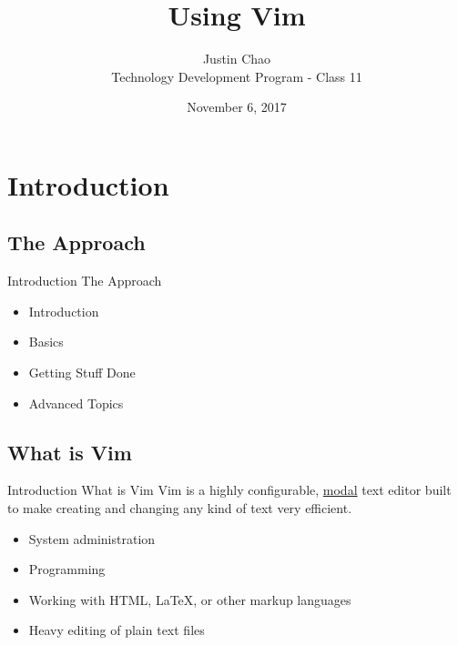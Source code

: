 \documentclass{beamer}
\title{Using Vim}
\author{Justin Chao \\ Technology Development Program - Class 11 \\}
\date{November 6, 2017}
\begin{document}
\frame{\titlepage}

\section{Introduction}

\subsection{The Approach}
\begin{frame} {Introduction} {The Approach}
    \begin{itemize}
        \item Introduction \\ 
        \item Basics \\
        \item Getting Stuff Done \\
        \item Advanced Topics
    \end{itemize}
\end{frame}

\subsection{What is Vim}
\begin{frame} {Introduction} {What is Vim}
    Vim is a highly configurable, \underline{modal} text editor built to make creating and changing any kind of text
    very efficient. \\

    \begin{itemize}
        \item System administration\\
        \item Programming\\
        \item Working with HTML, LaTeX, or other markup languages\\
        \item Heavy editing of plain text files\\
    \end{itemize}
\end{frame}
\end{document}
